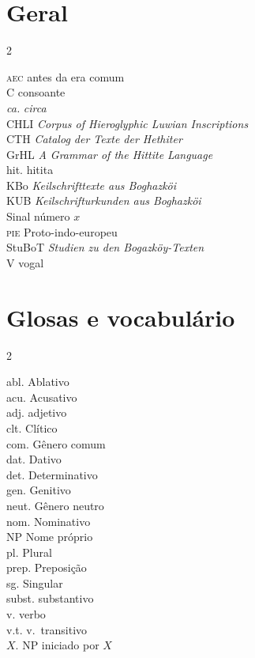 \newcommand{\abreviacao}[2]{\noindent #1 \hspace{10pt}\hfill #2\\}
\newenvironment{abreviacoes}{
	\flushright%
	\setlength{\columnsep}{50pt}
	\small
	\begin{multicols}{2}
		}{
	\end{multicols}
}

\section*{Geral}
\begin{abreviacoes}
	\abreviacao{\textsc{aec}}{antes da era comum}
	\abreviacao{C}{consoante}
	\abreviacao{\emph{ca.}}{\emph{circa}}
	\abreviacao{CHLI}{\emph{\foreignlanguage{english}{Corpus of Hieroglyphic Luwian Inscriptions}}}
	\abreviacao{CTH}{\emph{\foreignlanguage{german}{Catalog der Texte der Hethiter}}}
	\abreviacao{GrHL}{\emph{\foreignlanguage{english}{A Grammar of the Hittite Language}}}
	\abreviacao{hit.}{hitita}
	\abreviacao{KBo}{\emph{\foreignlanguage{german}{Keilschrifttexte aus Boghazköi}}}
	\abreviacao{KUB}{\emph{\foreignlanguage{german}{Keilschrifturkunden aus Boghazköi}}}
	\abreviacao{}{Sinal número $x$}
	\abreviacao{\textsc{pie}}{Proto-indo-europeu}
	\abreviacao{StuBoT}{\emph{\foreignlanguage{german}{Studien zu den
				Bogazköy-Texten}}}
	\abreviacao{V}{vogal}
\end{abreviacoes}


\section*{Glosas e vocabulário}
\begin{abreviacoes}
	\abreviacao{abl.}{Ablativo}
	\abreviacao{acu.}{Acusativo}
	\abreviacao{adj.}{adjetivo}
	\abreviacao{clt.}{Clítico}
	\abreviacao{com.}{Gênero comum}
	\abreviacao{dat.}{Dativo}
	\abreviacao{det.}{Determinativo}
	\abreviacao{gen.}{Genitivo}
	\abreviacao{neut.}{Gênero neutro}
	\abreviacao{nom.}{Nominativo}
	\abreviacao{NP}{Nome próprio}
	\abreviacao{pl.}{Plural}
	\abreviacao{prep.}{Preposição}
	\abreviacao{sg.}{Singular}
	\abreviacao{subst.}{substantivo}
	\abreviacao{v.}{verbo}
	\abreviacao{v.t.}{v.\ transitivo}
	\abreviacao{$X$.}{NP iniciado por $X$}
\end{abreviacoes}
